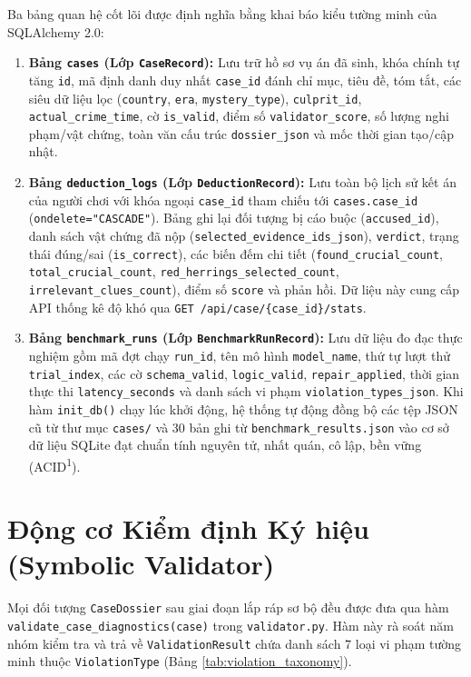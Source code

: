 Ba bảng quan hệ cốt lõi được định nghĩa bằng khai báo kiểu tường minh của SQLAlchemy 2.0:
\begin{enumerate}[leftmargin=1.5cm]
    \item \textbf{Bảng \texttt{cases} (Lớp \texttt{CaseRecord}):} Lưu trữ hồ sơ vụ án đã sinh, khóa chính tự tăng \texttt{id}, mã định danh duy nhất \texttt{case\_id} đánh chỉ mục, tiêu đề, tóm tắt, các siêu dữ liệu lọc (\texttt{country}, \texttt{era}, \texttt{mystery\_type}), \texttt{culprit\_id}, \texttt{actual\_crime\_time}, cờ \texttt{is\_valid}, điểm số \texttt{validator\_score}, số lượng nghi phạm/vật chứng, toàn văn cấu trúc \texttt{dossier\_json} và mốc thời gian tạo/cập nhật.
    \item \textbf{Bảng \texttt{deduction\_logs} (Lớp \texttt{DeductionRecord}):} Lưu toàn bộ lịch sử kết án của người chơi với khóa ngoại \texttt{case\_id} tham chiếu tới \texttt{cases.case\_id} (\texttt{ondelete="CASCADE"}). Bảng ghi lại đối tượng bị cáo buộc (\texttt{accused\_id}), danh sách vật chứng đã nộp (\texttt{selected\_evidence\_ids\_json}), \texttt{verdict}, trạng thái đúng/sai (\texttt{is\_correct}), các biến đếm chi tiết (\texttt{found\_crucial\_count}, \texttt{total\_crucial\_count}, \texttt{red\_herrings\_selected\_count}, \texttt{irrelevant\_clues\_count}), điểm số \texttt{score} và phản hồi. Dữ liệu này cung cấp API thống kê độ khó qua \texttt{GET /api/case/\{case\_id\}/stats}.
    \item \textbf{Bảng \texttt{benchmark\_runs} (Lớp \texttt{BenchmarkRunRecord}):} Lưu dữ liệu đo đạc thực nghiệm gồm mã đợt chạy \texttt{run\_id}, tên mô hình \texttt{model\_name}, thứ tự lượt thử \texttt{trial\_index}, các cờ \texttt{schema\_valid}, \texttt{logic\_valid}, \texttt{repair\_applied}, thời gian thực thi \texttt{latency\_seconds} và danh sách vi phạm \texttt{violation\_types\_json}. Khi hàm \texttt{init\_db()} chạy lúc khởi động, hệ thống tự động đồng bộ các tệp JSON cũ từ thư mục \texttt{cases/} và 30 bản ghi từ \texttt{benchmark\_results.json} vào cơ sở dữ liệu SQLite đạt chuẩn tính nguyên tử, nhất quán, cô lập, bền vững (ACID\textsuperscript{1}).
\end{enumerate}

\section{Động cơ Kiểm định Ký hiệu (Symbolic Validator)}
\label{sec:arch_validator}

Mọi đối tượng \texttt{CaseDossier} sau giai đoạn lắp ráp sơ bộ đều được đưa qua hàm \texttt{validate\_case\_diagnostics(case)} trong \texttt{validator.py}. Hàm này rà soát năm nhóm kiểm tra và trả về \texttt{ValidationResult} chứa danh sách 7 loại vi phạm tường minh thuộc \texttt{ViolationType} (Bảng \ref{tab:violation_taxonomy}).

